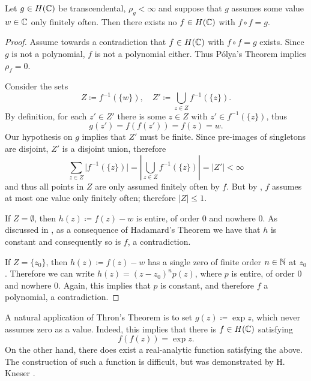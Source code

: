 \begin{theorem}[Thron] \label{thm:thron}
    Let $g \in H(\mathbb{C})$ be transcendental, $\rho_g < \infty$ and suppose that $g$ assumes some value $w \in \mathbb{C}$ only finitely often. Then there exists no $f \in H(\mathbb{C})$ with $f \circ f = g$.
\end{theorem}

\begin{proof}
    Assume towards a contradiction that $f \in H(\mathbb{C})$ with $f \circ f = g$ exists. Since $g$ is not a polynomial, $f$ is not a polynomial either. Thus Pólya's Theorem implies $\rho_f = 0$.
    
    Consider the sets
    $$ Z \coloneqq f^{-1}(\{ w \}), \quad Z' \coloneqq \bigcup_{z \in Z} f^{-1}(\{ z \}). $$
    By definition, for each $z' \in Z'$ there is some $z \in Z$ with $z' \in f^{-1}(\{ z \})$, thus
    $$ g(z') = f(f(z')) = f(z) = w. $$
    Our hypothesis on $g$ implies that $Z'$ must be finite. Since pre-images of singletons are disjoint, $Z'$ is a disjoint union, therefore
    $$ \sum_{z \in Z} \vert f^{-1}(\{ z \}) \vert = \left\vert \bigcup_{z \in Z} f^{-1}(\{ z \}) \right\vert = \vert Z' \vert < \infty $$
    and thus all points in $Z$ are only assumed finitely often by $f$. But by , $f$ assumes at most one value only finitely often; therefore $\vert Z \vert \leq 1$.

    If $Z = \emptyset$, then $h(z) \coloneqq f(z) - w$ is entire, of order $0$ and nowhere $0$. As discussed in , as a consequence of Hadamard's Theorem we have that $h$ is constant and consequently so is $f$, a contradiction.

    If $Z = \{ z_0 \}$, then $h(z) \coloneqq f(z) - w$ has a single zero of finite order $n \in \mathbb{N}$ at $z_0$. Therefore we can write $h(z) = (z - z_0)^n p(z)$, where $p$ is entire, of order $0$ and nowhere $0$. Again, this implies that $p$ is constant, and therefore $f$ a polynomial, a contradiction.
\end{proof}

\begin{example}
    A natural application of Thron's Theorem is to set $g(z) \coloneqq \exp z$, which never assumes zero as a value. Indeed, this implies that there is $f \in H(\mathbb{C})$ satisfying
    $$ f(f(z)) = \exp z. $$
    On the other hand, there does exist a real-analytic function satisfying the above. The construction of such a function is difficult, but was demonstrated by H. Kneser \cite{kneser-real-analytic-solution}.
\end{example}